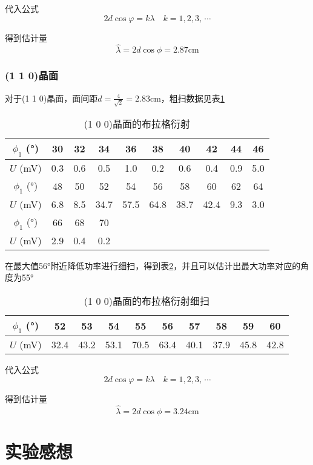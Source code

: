 \documentclass[11pt]{article}
\begin{document}
	代入公式\[2d\cos{\varphi} = k{\lambda}\quad k = 1,2,3,\,\cdots\]
	
	得到估计量\[\hat{\lambda}=2d\cos \phi=2.87\mathrm{cm}\]
	
	
	\subsubsection{(1 1 0)晶面}
	对于(1 1 0)晶面，面间距\(d=\frac{4}{\sqrt{2}}=2.83\)cm，粗扫数据见表\ref{tab:110}
	
	\begin{table}[h]
		\centering
		\begin{tabular}{|c|c|c|c|c|c|c|c|c|c|}
			\hline
			$\phi_1$ (°) & 30 & 32 & 34 & 36 & 38 & 40 & 42 & 44 & 46 \\ \hline
			$U$ (mV) & 0.3 & 0.6 & 0.5 & 1.0 & 0.2 & 0.6 & 0.4 & 0.9 & 5.0 \\ \hline
			$\phi_1$ (°) & 48 & 50 & 52 & 54 & 56 & 58 & 60 & 62 & 64 \\ \hline
			$U$ (mV) & 6.8 & 8.5 & 34.7 & 57.5 & 64.8 & 38.7 & 42.4 & 9.3 & 3.0 \\ \hline
			$\phi_1$ (°) & 66 & 68 & 70 &  &  &  &  &  &  \\ \hline
			$U$ (mV) & 2.9 & 0.4 & 0.2 &  &  &  &  &  &  \\ \hline
		\end{tabular}
		\caption{(1 0 0)晶面的布拉格衍射}
		\label{tab:110}
	\end{table}
	
	在最大值56°附近降低功率进行细扫，得到表\ref{tab:110'}，并且可以估计出最大功率对应的角度为55°
	
	\begin{table}[h!]
		\centering
		\begin{tabular}{|c|c|c|c|c|c|c|c|c|c|}
			\hline
			$\phi_1$ (°) & 52 & 53 & 54 & 55 & 56 & 57 & 58 & 59 & 60 \\ \hline
			$U$ (mV) & 32.4 & 43.2 & 53.1 & 70.5 & 63.4 & 40.1 & 37.9 & 45.8 & 42.8 \\ \hline
		\end{tabular}
		\caption{(1 0 0)晶面的布拉格衍射细扫}
		\label{tab:110'}
	\end{table}
	
	代入公式\[2d\cos{\varphi} = k{\lambda}\quad k = 1,2,3,\,\cdots\]
	
	得到估计量\[\hat{\lambda}=2d\cos \phi=3.24\mathrm{cm}\]
	


	\section{实验感想}
	
\end{document}

